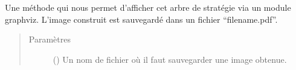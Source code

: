 \documentclass[letterpaper,10pt,french]{sphinxmanual}
\begin{document}
\begin{fulllineitems}
\begin{fulllineitems}
\label{\detokenize{index:StrategyTree.StrategyTree.visualize}}
Une méthode qui nous permet d’afficher cet arbre de stratégie via un module graphviz. L’image construit est
sauvegardé dans un fichier “filename.pdf”.
\begin{quote}\begin{description}
\item[{Paramètres}] \leavevmode
{} (\sphinxstyleliteralemphasis{\sphinxupquote{, }}) \textendash{} Un nom de fichier où il faut sauvegarder une image obtenue.

\end{description}\end{quote}

\end{fulllineitems}


\end{fulllineitems}

\end{document}
